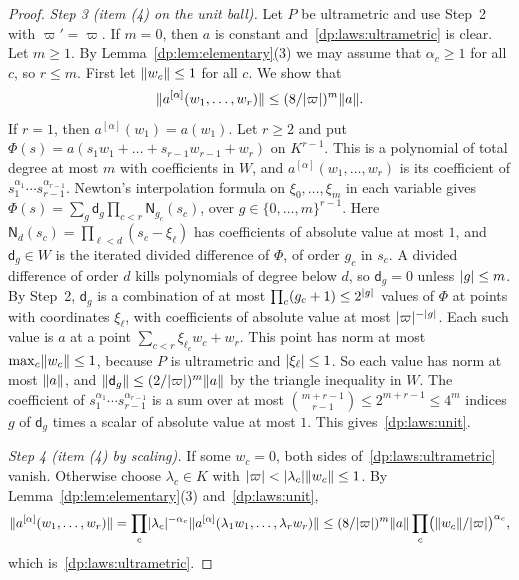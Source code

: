 \begin{proof}
\emph{Step 3 (item (4) on the unit ball).} Let $P$ be ultrametric and use Step~2 with $\varpi'=\varpi$. If $m=0$, then $a$ is constant and~\eqref{dp:laws:ultrametric} is clear. Let $m\ge1$. By Lemma~\ref{dp:lem:elementary}(3) we may assume that $\alpha_c\ge1$ for all $c$, so $r\le m$. First let $\lVert w_c\rVert\le1$ for all $c$. We show that
\begin{equation}\label{dp:laws:unit}
 \lVert a^{[\alpha]}(w_1,\dots,w_r)\rVert\le(8/\lvert \varpi\rvert)^m\lVert a\rVert.
\end{equation}
If $r=1$, then $a^{[\alpha]}(w_1)=a(w_1)$. Let $r\ge2$ and put $\Phi(s)=a(s_1w_1+\dots+s_{r-1}w_{r-1}+w_r)$ on $K^{r-1}$. This is a polynomial of total degree at most $m$ with coefficients in $W$, and $a^{[\alpha]}(w_1,\dots,w_r)$ is its coefficient of $s_1^{\alpha_1}\cdots s_{r-1}^{\alpha_{r-1}}$. Newton's interpolation formula on $\xi_0,\dots,\xi_m$ in each variable gives $\Phi(s)=\sum_g\mathsf d_g\prod_{c<r}\mathsf N_{g_c}(s_c)$, over $g\in\{0,\dots,m\}^{r-1}$. Here $\mathsf N_d(s_c)=\prod_{\ell<d}(s_c-\xi_\ell)$ has coefficients of absolute value at most $1$, and $\mathsf d_g\in W$ is the iterated divided difference of $\Phi$, of order $g_c$ in $s_c$. A divided difference of order $d$ kills polynomials of degree below $d$, so $\mathsf d_g=0$ unless $\lvert g\rvert\le m$. By Step~2, $\mathsf d_g$ is a combination of at most $\prod_c(g_c+1)\le2^{\lvert g\rvert}$ values of $\Phi$ at points with coordinates $\xi_\ell$, with coefficients of absolute value at most $\lvert \varpi\rvert^{-\lvert g\rvert}$. Each such value is $a$ at a point $\sum_{c<r}\xi_{\ell_c}w_c+w_r$. This point has norm at most $\max_c\lVert w_c\rVert\le1$, because $P$ is ultrametric and $\lvert \xi_\ell\rvert\le1$. So each value has norm at most $\lVert a\rVert$, and $\lVert \mathsf d_g\rVert\le(2/\lvert \varpi\rvert)^m\lVert a\rVert$ by the triangle inequality in $W$. The coefficient of $s_1^{\alpha_1}\cdots s_{r-1}^{\alpha_{r-1}}$ is a sum over at most $\binom{m+r-1}{r-1}\le2^{m+r-1}\le4^m$ indices $g$ of $\mathsf d_g$ times a scalar of absolute value at most $1$. This gives~\eqref{dp:laws:unit}.

\emph{Step 4 (item (4) by scaling).} If some $w_c=0$, both sides of~\eqref{dp:laws:ultrametric} vanish. Otherwise choose $\lambda_c\in K$ with $\lvert \varpi\rvert<\lvert \lambda_c\rvert\lVert w_c\rVert\le1$. By Lemma~\ref{dp:lem:elementary}(3) and~\eqref{dp:laws:unit},
\[
 \lVert a^{[\alpha]}(w_1,\dots,w_r)\rVert=\prod_c\lvert \lambda_c\rvert^{-\alpha_c}\lVert a^{[\alpha]}(\lambda_1w_1,\dots,\lambda_rw_r)\rVert\le(8/\lvert \varpi\rvert)^m\lVert a\rVert\prod_c\bigl(\lVert w_c\rVert/\lvert \varpi\rvert\bigr)^{\alpha_c},
\]
which is~\eqref{dp:laws:ultrametric}.
\end{proof}

